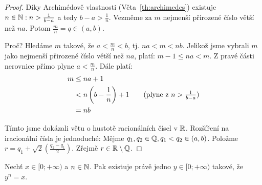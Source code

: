 \begin{proof}
    Díky Archimédově vlastnosti (Věta~\ref{th:archimedes}) existuje 
    $n \in \mathbb{N}: n > \frac{1}{b-a}$ a tedy
    $b - a > \frac{1}{n}.$ Vezměme za $m$ nejmenší přirozené číslo větší než $na$.
    Potom $\frac{m}{n} = q \in (a,b)$. 
    
    Proč? Hledáme $m$ takové, že $a < \frac{m}{n} < b$, tj. $na < m 
    < nb$. Jelikož jsme vybrali $m$ jako nejmenší přirozené číslo větší než $na$,
    platí: $m-1 \leq na < m$. Z pravé části nerovnice přímo plyne $a < \frac{m}{n}$.
    Dále platí:
    \begin{align*}
        m &\leq na+1 \\
          &< n\left(b-\frac{1}{n}\right) +1 \tag{plyne z $n > \frac{1}{b-a}$} \\
          &=nb
    \end{align*}

    Tímto jsme dokázali větu o hustotě racionálních čísel v $\mathbb{R}$. Rozšíření na
    iracionální čísla je jednoduché: Mějme $q_1, q_2 \in \mathbb{Q}, q_1 < q_2 \in (a,b)$. 
    Položme $r = q_1 + \sqrt{2}
    \left(\frac{q_2-q_1}{2}\right)$. Zřejmě $r \in \mathbb{R} \setminus \mathbb{Q}$.
\end{proof}

\begin{theorem}
    Nechť $x \in [0; +\infty)$ a $n \in \mathbb{N}$. Pak existuje právě jedno $y \in 
        [0;+\infty)$ takové, že $y^n = x$.
\end{theorem}

